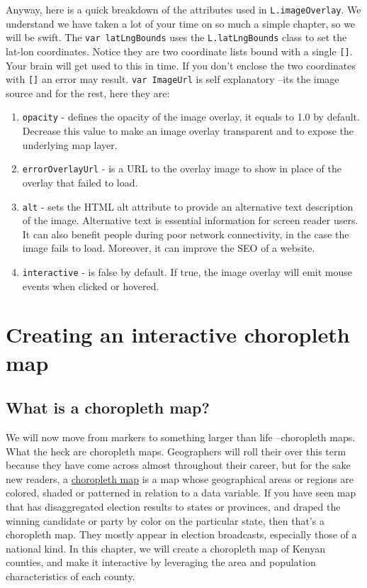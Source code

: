 \documentclass[
]{book}
\begin{document}
Anyway, here is a quick breakdown of the attributes used in \texttt{L.imageOverlay}. We understand we have taken a lot of your time on so much a simple chapter, so we will be swift. The \texttt{var\ latLngBounds} uses the \texttt{L.latLngBounds} class to set the lat-lon coordinates. Notice they are two coordinate lists bound with a single \texttt{{[}{]}}. Your brain will get used to this in time. If you don't enclose the two coordinates with \texttt{{[}{]}} an error may result. \texttt{var\ ImageUrl} is self explanatory --its the image source and for the rest, here they are:

\begin{enumerate}
\def\labelenumi{\arabic{enumi}.}
\item
  \texttt{opacity} - defines the opacity of the image overlay, it equals to 1.0 by default. Decrease this value to make an image overlay transparent and to expose the underlying map layer.
\item
  \texttt{errorOverlayUrl} - is a URL to the overlay image to show in place of the overlay that failed to load.
\item
  \texttt{alt} - sets the HTML alt attribute to provide an alternative text description of the image. Alternative text is essential information for screen reader users. It can also benefit people during poor network connectivity, in the case the image fails to load. Moreover, it can improve the SEO of a website.
\item
  \texttt{interactive} - is false by default. If true, the image overlay will emit mouse events when clicked or hovered.
\end{enumerate}

\hypertarget{creating-an-interactive-choropleth-map}{%
\chapter{Creating an interactive choropleth map}\label{creating-an-interactive-choropleth-map}}

\hypertarget{what-is-a-choropleth-map}{%
\section{What is a choropleth map?}\label{what-is-a-choropleth-map}}

We will now move from markers to something larger than life --choropleth maps. What the heck are choropleth maps. Geographers will roll their over this term because they have come across almost throughout their career, but for the sake new readers, a \href{https://datavizcatalogue.com/methods/choropleth.html}{choropleth map} is a map whose geographical areas or regions are colored, shaded or patterned in relation to a data variable. If you have seen map that has disaggregated election results to states or provinces, and draped the winning candidate or party by color on the particular state, then that's a choropleth map. They mostly appear in election broadcasts, especially those of a national kind. In this chapter, we will create a choropleth map of Kenyan counties, and make it interactive by leveraging the area and population characteristics of each county.
\end{document}
